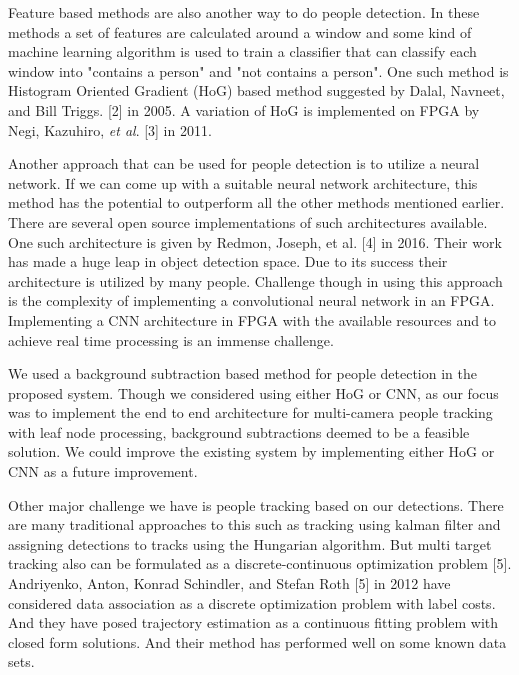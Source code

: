 \documentclass[12pt,a4paper]{report}
\begin{document}
Feature based methods are also another way to do people detection. In these methods a set of features are calculated around a window and some kind of machine learning algorithm is used to train a classifier that can classify each window into "contains a person" and "not contains a person". One such method is Histogram Oriented Gradient (HoG) based method suggested by Dalal, Navneet, and Bill Triggs. [2] in 2005. A variation of HoG is implemented on FPGA by Negi, Kazuhiro, \textit{et al}. [3] in 2011.\vspace{0.3cm}

Another approach that can be used for people detection is to utilize a neural network. If we can come up with a suitable neural network architecture, this method has the potential to outperform all the other methods mentioned earlier. There are several open source implementations of such architectures available. One such architecture is given by Redmon, Joseph, et al. [4] in 2016. Their work has made a huge leap in object detection space. Due to its success their architecture is utilized by many people. Challenge though in using this approach is the complexity of implementing a convolutional neural network in an FPGA.  Implementing a CNN architecture in FPGA with the available resources and to achieve real time processing is an immense challenge. \vspace{0.3cm}

We used a background subtraction based method for people detection in the proposed system. Though we considered using either HoG or CNN, as our focus was to implement the end to end architecture for multi-camera people tracking with leaf node processing, background subtractions deemed to be a feasible solution. We could improve the existing system by implementing either HoG or CNN as a future improvement.\vspace{0.3cm}

Other major challenge we have is people tracking based on our detections. There are many traditional approaches to this such as tracking using kalman filter and assigning detections to tracks using the Hungarian algorithm. But multi target tracking also can be formulated as a discrete-continuous optimization problem [5]. Andriyenko, Anton, Konrad Schindler, and Stefan Roth [5] in 2012 have considered data association as a discrete optimization problem with label costs. And they have posed trajectory estimation as a continuous fitting problem with closed form solutions. And their method has performed well on some known data sets.\vspace{0.3cm}
\end{document}
